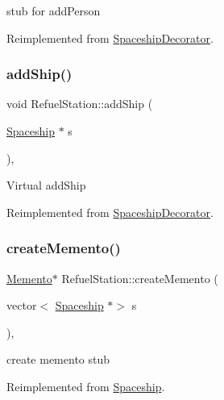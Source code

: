 stub for add\+Person 

Reimplemented from \hyperlink{classSpaceshipDecorator_a6e289d8a65f35b9f223255ae0eaa3b00}{Spaceship\+Decorator}.

\mbox{\label{classRefuelStation_a03510ee8365b5095ca80fac0c5a0a780}} 
\subsubsection{\texorpdfstring{add\+Ship()}{addShip()}}
{\footnotesize\ttfamily void Refuel\+Station\+::add\+Ship (\begin{DoxyParamCaption}\item[{\hyperlink{classSpaceship}{Spaceship} $\ast$}]{s }\end{DoxyParamCaption})\hspace{0.3cm}{\ttfamily [inline]}, {\ttfamily [virtual]}}

Virtual add\+Ship 

Reimplemented from \hyperlink{classSpaceshipDecorator_a5ed39419f5fab65dd4af11bf5136f7a4}{Spaceship\+Decorator}.

\mbox{\label{classRefuelStation_abd79d981cc7650d6417b8c8166a3fb85}} 
\subsubsection{\texorpdfstring{create\+Memento()}{createMemento()}}
{\footnotesize\ttfamily \hyperlink{classMemento}{Memento}$\ast$ Refuel\+Station\+::create\+Memento (\begin{DoxyParamCaption}\item[{vector$<$ \hyperlink{classSpaceship}{Spaceship} $\ast$$>$}]{s }\end{DoxyParamCaption})\hspace{0.3cm}{\ttfamily [inline]}, {\ttfamily [virtual]}}

create memento stub 

Reimplemented from \hyperlink{classSpaceship_a6d272f846b019dec8226ddab65648a7b}{Spaceship}.

\mbox{\label{classRefuelStation_aa8fccc0887cac98193803762533f9ab1}} 
